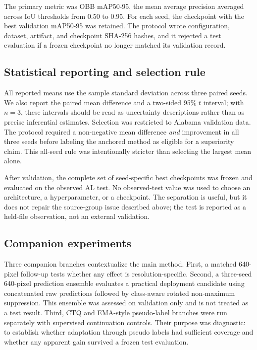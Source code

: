 \documentclass[preprint,12pt,authoryear]{elsarticle}
\newcommand{\metric}{mAP50-95}
\begin{document}
The primary metric was OBB \metric, the mean average precision averaged across IoU thresholds from 0.50 to 0.95. For each seed, the checkpoint with the best validation \metric{} was retained. The protocol wrote configuration, dataset, artifact, and checkpoint SHA-256 hashes, and it rejected a test evaluation if a frozen checkpoint no longer matched its validation record.

\subsection{Statistical reporting and selection rule}

All reported means use the sample standard deviation across three paired seeds. We also report the paired mean difference and a two-sided 95\% $t$ interval; with $n=3$, these intervals should be read as uncertainty descriptions rather than as precise inferential estimates. Selection was restricted to Alabama validation data. The protocol required a non-negative mean difference \emph{and} improvement in all three seeds before labeling the anchored method as eligible for a superiority claim. This all-seed rule was intentionally stricter than selecting the largest mean alone.

After validation, the complete set of seed-specific best checkpoints was frozen and evaluated on the observed AL test. No observed-test value was used to choose an architecture, a hyperparameter, or a checkpoint. The separation is useful, but it does not repair the source-group issue described above; the test is reported as a held-file observation, not an external validation.

\subsection{Companion experiments}

Three companion branches contextualize the main method. First, a matched 640-pixel follow-up tests whether any effect is resolution-specific. Second, a three-seed 640-pixel prediction ensemble evaluates a practical deployment candidate using concatenated raw predictions followed by class-aware rotated non-maximum suppression. This ensemble was assessed on validation only and is not treated as a test result. Third, CTQ and EMA-style pseudo-label branches were run separately with supervised continuation controls. Their purpose was diagnostic: to establish whether adaptation through pseudo labels had sufficient coverage and whether any apparent gain survived a frozen test evaluation.
\end{document}
